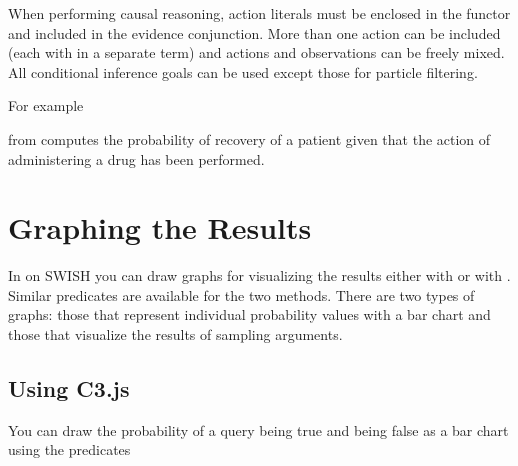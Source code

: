 \documentclass[letterpaper,10pt,english]{sphinxmanual}
\begin{document}
\sphinxAtStartPar
When performing causal reasoning, action literals must be enclosed in the  functor and included in the evidence conjunction.
More than one action can be included (each with in a separate  term) and actions and observations can be freely mixed.
All conditional inference goals can be used except those for particle filtering.

\sphinxAtStartPar
For example

\begin{sphinxVerbatim}[commandchars=\\\{\}]
 
\end{sphinxVerbatim}

\sphinxAtStartPar
from  computes the probability of recovery of a patient given that the action of administering a drug has been performed.


\section{Graphing the Results}
\label{\detokenize{index:graphing-the-results}}
\sphinxAtStartPar
In  on SWISH you can draw graphs for visualizing the results either with  or with .
Similar predicates are available for the two methods.
There are two types of graphs: those that represent individual probability values with a bar chart and those that visualize the results of sampling arguments.


\subsection{Using C3.js}
\label{\detokenize{index:using-c3-js}}
\sphinxAtStartPar
You can draw the probability of a query being true and being false as a bar chart using the predicates
\end{document}
